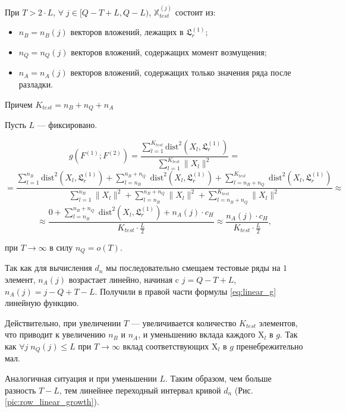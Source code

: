 \documentclass[specialist, substylefile = spbu.rtx,
			   subf, href, 12pt]{disser}
\begin{document}
При $ T > 2 \cdot L $, $ \forall \; j \in [Q - T + L, Q - L)$, $ \mathbb{X}_{test}^{(j)} $ состоит из:

\begin{itemize}
	\item $ n_B = n_B(j) $ векторов вложений, лежащих в $ \mathfrak{L}_r^{(1)} $;
	\item $ n_Q = n_Q(j) $ векторов вложений, содержащих момент возмущения;
	\item $ n_A = n_A(j) $ векторов вложений, содержащих только значения ряда после разладки.
\end{itemize}

Причем $ K_{test} = n_B + n_Q + n_A $

Пусть $ L $ --- фиксировано. 

$$ g(F^{(1)}; F^{(2)}) = \frac{\sum\limits_{l=1}^{K_{test}}\mathrm{dist}^2(X_l, \mathfrak{L}_r^{(1)})}{\sum\limits_{l=1}^{K_{test}}\|X_l\|^2} = $$
$$ = \frac{\sum\limits_{l=1}^{n_B}\mathrm{dist}^2(X_l, \mathfrak{L}_r^{(1)}) + \sum\limits_{l=n_B}^{n_B + n_Q}\;\mathrm{dist}^2(X_l, \mathfrak{L}_r^{(1)}) + \sum\limits_{l=n_B + n_Q}^{K_{test}}\;\mathrm{dist}^2(X_l, \mathfrak{L}_r^{(1)})}{\sum\limits_{l=1}^{n_B}\|X_l\|^2 + \sum\limits_{l=n_B}^{n_B+n_Q}\|X_l\|^2 + \sum\limits_{l=n_B+n_Q}^{K_{test}}\|X_l\|^2} \approx $$
\begin{equation}\label{eq:linear_g}
	\approx \frac{0 + \sum\limits_{l=n_B}^{n_B+n_Q}\;\mathrm{dist}^2(X_l, \mathfrak{L}_r^{(1)}) + n_A(j) \cdot c_H}{K_{test}\cdot \frac{L}{2}} \approx \frac{n_A(j) \cdot c_H}{K_{test}\cdot \frac{L}{2}},
\end{equation}

при $ T \rightarrow \infty $ в силу $ n_Q = o(T) $.

Так как для вычисления $ d_n $ мы последовательно смещаем тестовые ряды на $ 1 $ элемент, $ n_A(j) $ возрастает линейно, начиная c $ j = Q-T+L $, $ n_A(j) = j - Q + T - L $. Получили в правой части формулы \eqref{eq:linear_g} линейную функцию. 

Действительно, при увеличении $ T $ --- увеличивается количество $ K_{test} $ элементов, что приводит к увеличению $ n_B $ и $ n_A $, и уменьшению вклада каждого $ \mathrm{X}_l $ в $ g $. Так как $ \forall j \; n_Q(j) \leq L $ при $ T \rightarrow \infty $ вклад соответствующих $ \mathrm{X}_l $ в $ g $ пренебрежительно мал.

Аналогичная ситуация и при уменьшении $ L $. Таким образом, чем больше разность $ T-L $, тем линейнее переходный интервал кривой $ d_n $ (Рис. \ref{pic:row_linear_growth}).
\end{document}

